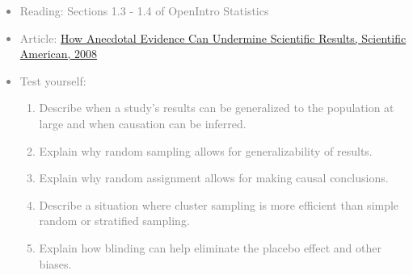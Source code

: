 \documentclass[11pt]{article}
\newcommand{\gray}[1]{\textcolor{gray}{#1}}
\begin{document}
\gray{
{\it
\vspace{-0.75cm}
\begin{itemize}
\renewcommand{\labelitemi}{{\textcolor{dark}{$\ast$}}}
\item Reading: Sections 1.3 - 1.4 of OpenIntro Statistics
\item Article: \href{http://www.scientificamerican.com/article.cfm?id=how-anecdotal-evidence-can-undermine-scientific-results}{How Anecdotal Evidence Can Undermine Scientific Results, Scientific American, 2008}
\item Test yourself: 
\begin{enumerate}
\item Describe when a study's results can be generalized to the population at large and when causation can be inferred.
\item Explain why random sampling allows for generalizability of results.
\item Explain why random assignment allows for making causal conclusions.
\item Describe a situation where cluster sampling is more efficient than simple random or stratified sampling. 
\item Explain how blinding can help eliminate the placebo effect and other biases. \\
\end{enumerate}
\end{itemize}
}}

%
\end{document}
